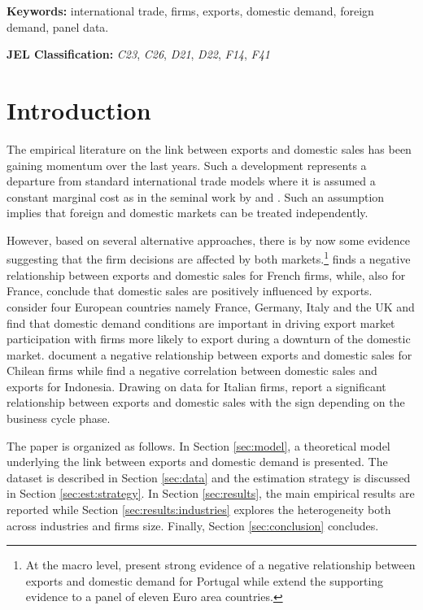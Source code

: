 \documentclass[a4paper,12pt]{article}
\begin{document}
\textbf{Keywords:} international trade, firms, exports, domestic demand, foreign demand, panel data.

\textbf{JEL Classification:} \textit{C23}, \textit{C26}, \textit{D21}, \textit{D22}, \textit{F14}, \textit{F41} 

\newpage


\section{Introduction}

The empirical literature on the link between exports and domestic sales has
been gaining momentum over the last years. Such a development represents a
departure from standard international trade models where it is
assumed a constant marginal cost as in the seminal work by \cite{krugman1979increasing,krugman1980scale} and \cite{melitz2003impact}. Such an assumption implies that foreign and
domestic markets can be treated independently.

However, based on several alternative approaches, there is by now some evidence suggesting that the firm decisions are affected by both markets.\footnote{At the macro level, \cite{esteves2015there} present strong evidence of a
negative relationship between exports and domestic demand for Portugal
while \cite{bobeica2016exports} extend the supporting evidence to a panel of eleven Euro area countries.} \cite{vannoorenberghe2012firm} finds a negative relationship between exports and domestic sales for French firms, while, also for France, \cite{berman2015export} conclude that domestic sales are positively influenced by exports. \cite{altomonte2013firm} consider four European countries namely France, Germany, Italy and the UK and find that domestic demand conditions are important in driving export market participation with firms more likely to export during a downturn of the domestic market. \cite{BlumClaroHorstmann2013} document a negative relationship between exports and domestic sales for Chilean firms while \cite{AhnMcQuoid2017} find a negative correlation between domestic sales and exports for Indonesia. Drawing on data for Italian firms, \cite{bugamelli2015domestic} report a significant relationship between exports and domestic sales with the sign depending on the business cycle phase.

The paper is organized as follows. In Section \ref{sec:model}, a theoretical model
underlying the link between exports and domestic demand is presented. The
dataset is described in Section \ref{sec:data} and the estimation strategy is discussed
in Section \ref{sec:est:strategy}. In Section \ref{sec:results}, the main empirical results are reported while Section \ref{sec:results:industries} explores the heterogeneity both across industries and firms size. Finally,
Section \ref{sec:conclusion} concludes.
\end{document}
